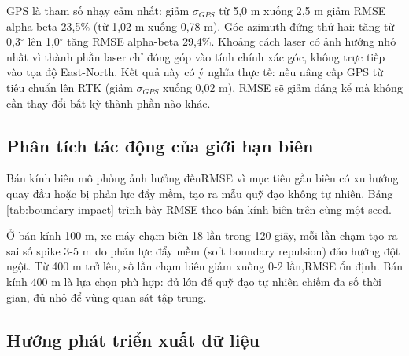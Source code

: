 GPS là tham số nhạy cảm nhất: giảm $\sigma_{GPS}$ từ 5,0 m xuống 2,5 m giảm RMSE alpha-beta 23,5\% (từ 1,02 m xuống 0,78 m). Góc azimuth đứng thứ hai: tăng từ 0,3$^\circ$ lên 1,0$^\circ$ tăng RMSE alpha-beta 29,4\%. Khoảng cách laser có ảnh hưởng nhỏ nhất vì thành phần laser chỉ đóng góp vào tính chính xác góc, không trực tiếp vào tọa độ East-North. Kết quả này có ý nghĩa thực tế: nếu nâng cấp GPS từ tiêu chuẩn lên RTK (giảm $\sigma_{GPS}$ xuống 0,02 m), RMSE sẽ giảm đáng kể mà không cần thay đổi bất kỳ thành phần nào khác.

\subsection{Phân tích tác động của giới hạn biên}

\hspace{0.5cm} Bán kính biên mô phỏng ảnh hưởng đếnRMSE vì mục tiêu gần biên có xu hướng quay đầu hoặc bị phản lực đẩy mềm, tạo ra mẫu quỹ đạo không tự nhiên. Bảng \ref{tab:boundary-impact} trình bày RMSE theo bán kính biên trên cùng một seed.

\begin{table}[H]
\centering
\caption{RMSE theo bán kính biên (xe máy, seed=42)}
\label{tab:boundary-impact}
\end{table}

Ở bán kính 100 m, xe máy chạm biên 18 lần trong 120 giây, mỗi lần chạm tạo ra sai số spike 3-5 m do phản lực đẩy mềm (soft boundary repulsion) đảo hướng đột ngột. Từ 400 m trở lên, số lần chạm biên giảm xuống 0-2 lần,RMSE ổn định. Bán kính 400 m là lựa chọn phù hợp: đủ lớn để quỹ đạo tự nhiên chiếm đa số thời gian, đủ nhỏ để vùng quan sát tập trung.

\subsection{Hướng phát triển xuất dữ liệu}

